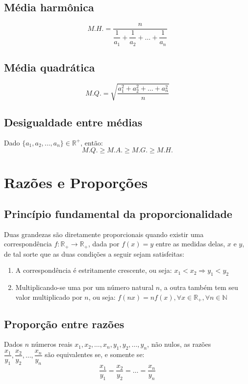 \documentclass{article}
\begin{document}
\subsection{Média harmônica}
\begin{equation*}
    M.H.=\dfrac{n}{\dfrac{1}{a_1}+\dfrac{1}{a_2}+\ldots+\dfrac{1}{a_n}}
\end{equation*}

\subsection{Média quadrática}
\begin{equation*}
    M.Q.=\sqrt{\dfrac{a_1^2+a_2^2+\ldots+a_n^2}{n}}
\end{equation*}

\subsection{Desigualdade entre médias}
Dado $\{a_1,a_2,\ldots,a_n\}\in\mathbb{R^+}$, então:
\begin{equation*}
    M.Q.\geq M.A.\geq M.G. \geq M.H.
\end{equation*}


\section{Razões e Proporções}
\subsection{Princípio fundamental da proporcionalidade}
Duas grandezas são diretamente proporcionais quando existir uma correspondência $f:\mathbb{R_+}\rightarrow\mathbb{R_+}$, dada por $f(x)=y$ entre as medidas delas, $x$ e $y$, de tal sorte que as duas condições a seguir sejam satisfeitas:
\begin{enumerate}[\quad 1)]
    \item A correspondência é estritamente crescente, ou seja: $x_1<x_2\Rightarrow y_1<y_2$
    \item Multiplicando-se uma por um número natural $n$, a outra também tem seu valor multiplicado por $n$, ou seja: $f(nx)=nf(x), \forall x\in\mathbb{R_+}, \forall n \in \mathbb{N}$
\end{enumerate}

\subsection{Proporção entre razões}
Dados $n$ números reais $x_1,x_2,\ldots,x_n,y_1,y_2,\ldots,y_n$, não nulos, as razões $\dfrac{x_1}{y_1},\dfrac{x_2}{y_2},\ldots,\dfrac{x_n}{y_n}$ são equivalentes se, e somente se:
$$\dfrac{x_1}{y_1}=\dfrac{x_2}{y_2}=\ldots=\dfrac{x_n}{y_n}$$
\end{document}
